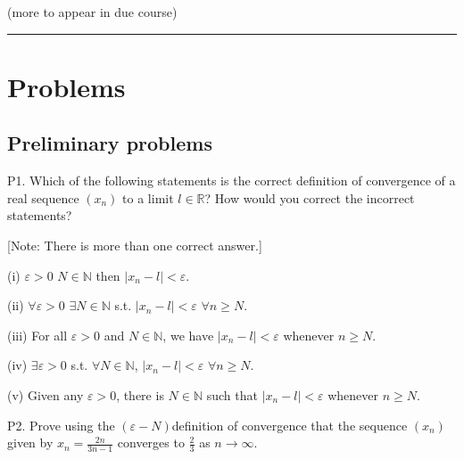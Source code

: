 \documentclass[letterpaper,10pt,english]{jupyterBook}
\begin{document}
\sphinxAtStartPar
{\hyperref[\detokenize{Solutions-upto6:sol}]{}} (more to appear in due course) 
  {\hyperref[\detokenize{Solutions-upto6:ch1sol}]{}} 
  {\hyperref[\detokenize{Solutions-upto6:ch2sol}]{}} 




\bigskip\hrule\bigskip


\sphinxstepscope


\section{Problems}
\label{\detokenize{Problems:problems}}\label{\detokenize{Problems:prob}}\label{\detokenize{Problems::doc}}

\subsection{Preliminary problems}
\label{\detokenize{Problems:preliminary-problems}}\label{\detokenize{Problems:ch1prob}}\label{\detokenize{Problems:p1}}
\sphinxAtStartPar
P1.
Which of the following statements is the correct definition of convergence of a real sequence \((x_n)\) to a limit \(l\in\mathbb{R}\)? How would you correct the incorrect statements?

{[}Note: There is more than one correct answer.{]}

\sphinxAtStartPar
(i) \(\varepsilon>0\) \(N\in\mathbb{N}\) then \(|x_n-l|<\varepsilon\).

\sphinxAtStartPar
(ii) \(\forall\varepsilon>0\) \(\exists N\in\mathbb{N}\) s.t.  \(|x_n-l|<\varepsilon\) \(\forall n\geq N\).

\sphinxAtStartPar
(iii) For all \(\varepsilon>0\) and \(N\in\mathbb{N}\), we have \(|x_n-l|<\varepsilon\) whenever \(n\geq N\).

\sphinxAtStartPar
(iv) \(\exists\varepsilon>0\) s.t. \(\forall N\in\mathbb{N}\), \(|x_n-l|<\varepsilon\) \(\forall n\geq N\).

\sphinxAtStartPar
(v) Given any \(\varepsilon>0\), there is \(N\in\mathbb{N}\) such that \(|x_n-l|<\varepsilon\) whenever \(n\geq N\).


\label{\detokenize{Problems:p2}}
\sphinxAtStartPar
P2.  Prove using the \((\varepsilon-N)\)\sphinxhyphen{}definition of convergence that the sequence \((x_n)\) given by \(x_n = \frac{2n}{3n-1}\) converges to \(\frac{2}{3}\) as \(n\rightarrow\infty\).
\end{document}

